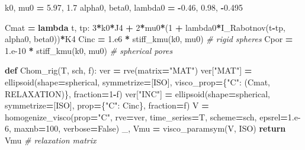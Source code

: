 \documentclass[
  a4paper,
  numbers=noendperiod,
  DIV=12]{scrreprt}
\newenvironment{Shaded}{\begin{snugshade}}{\end{snugshade}}
\newcommand{\CommentTok}[1]{\textcolor[rgb]{0.56,0.35,0.01}{\textit{#1}}}
\newcommand{\ControlFlowTok}[1]{\textcolor[rgb]{0.13,0.29,0.53}{\textbf{#1}}}
\newcommand{\DecValTok}[1]{\textcolor[rgb]{0.00,0.00,0.81}{#1}}
\newcommand{\FloatTok}[1]{\textcolor[rgb]{0.00,0.00,0.81}{#1}}
\newcommand{\KeywordTok}[1]{\textcolor[rgb]{0.13,0.29,0.53}{\textbf{#1}}}
\newcommand{\NormalTok}[1]{#1}
\newcommand{\OperatorTok}[1]{\textcolor[rgb]{0.81,0.36,0.00}{\textbf{#1}}}
\newcommand{\StringTok}[1]{\textcolor[rgb]{0.31,0.60,0.02}{#1}}
\newcommand{\VariableTok}[1]{\textcolor[rgb]{0.00,0.00,0.00}{#1}}
\begin{document}
\begin{Shaded}
\begin{Highlighting}[]
\NormalTok{k0, mu0 }\OperatorTok{=} \FloatTok{5.97}\NormalTok{, }\FloatTok{1.7}
\NormalTok{alpha0, beta0, lambda0 }\OperatorTok{=} \OperatorTok{{-}}\FloatTok{0.46}\NormalTok{, }\FloatTok{0.98}\NormalTok{, }\OperatorTok{{-}}\FloatTok{0.495}

\NormalTok{Cmat }\OperatorTok{=} \KeywordTok{lambda}\NormalTok{ t, tp: }\DecValTok{3}\OperatorTok{*}\NormalTok{k0}\OperatorTok{*}\NormalTok{J4 }\OperatorTok{+} \DecValTok{2}\OperatorTok{*}\NormalTok{mu0}\OperatorTok{*}\NormalTok{(}\DecValTok{1} \OperatorTok{+}\NormalTok{ lambda0}\OperatorTok{*}\NormalTok{I\_Rabotnov(t}\OperatorTok{{-}}\NormalTok{tp, alpha0, beta0))}\OperatorTok{*}\NormalTok{K4}
\NormalTok{Cinc }\OperatorTok{=} \FloatTok{1.e6}   \OperatorTok{*}\NormalTok{ stiff\_kmu(k0, mu0)   }\CommentTok{\# rigid spheres}
\NormalTok{Cpor }\OperatorTok{=} \FloatTok{1.e{-}10} \OperatorTok{*}\NormalTok{ stiff\_kmu(k0, mu0)   }\CommentTok{\# spherical pores}

\KeywordTok{def}\NormalTok{ Chom\_rig(T, sch, f):}
\NormalTok{    ver }\OperatorTok{=}\NormalTok{ rve(matrix}\OperatorTok{=}\StringTok{"MAT"}\NormalTok{)}
\NormalTok{    ver[}\StringTok{"MAT"}\NormalTok{] }\OperatorTok{=}\NormalTok{ ellipsoid(shape}\OperatorTok{=}\NormalTok{spherical, symmetrize}\OperatorTok{=}\NormalTok{[ISO],}
\NormalTok{                            visco\_prop}\OperatorTok{=}\NormalTok{\{}\StringTok{"C"}\NormalTok{: (Cmat, RELAXATION)\}, fraction}\OperatorTok{=}\DecValTok{1}\OperatorTok{{-}}\NormalTok{f)}
\NormalTok{    ver[}\StringTok{"INC"}\NormalTok{] }\OperatorTok{=}\NormalTok{ ellipsoid(shape}\OperatorTok{=}\NormalTok{spherical, symmetrize}\OperatorTok{=}\NormalTok{[ISO],}
\NormalTok{                            prop}\OperatorTok{=}\NormalTok{\{}\StringTok{"C"}\NormalTok{: Cinc\}, fraction}\OperatorTok{=}\NormalTok{f)}
\NormalTok{    V }\OperatorTok{=}\NormalTok{ homogenize\_visco(prop}\OperatorTok{=}\StringTok{"C"}\NormalTok{, rve}\OperatorTok{=}\NormalTok{ver, time\_series}\OperatorTok{=}\NormalTok{T,}
\NormalTok{                         scheme}\OperatorTok{=}\NormalTok{sch, epsrel}\OperatorTok{=}\FloatTok{1.e{-}6}\NormalTok{, maxnb}\OperatorTok{=}\DecValTok{100}\NormalTok{, verbose}\OperatorTok{=}\VariableTok{False}\NormalTok{)}
\NormalTok{    \_, Vmu }\OperatorTok{=}\NormalTok{ visco\_paramsym(V, ISO)}
    \ControlFlowTok{return}\NormalTok{ Vmu   }\CommentTok{\# relaxation matrix}


\end{Highlighting}
\end{Shaded}
\end{document}

